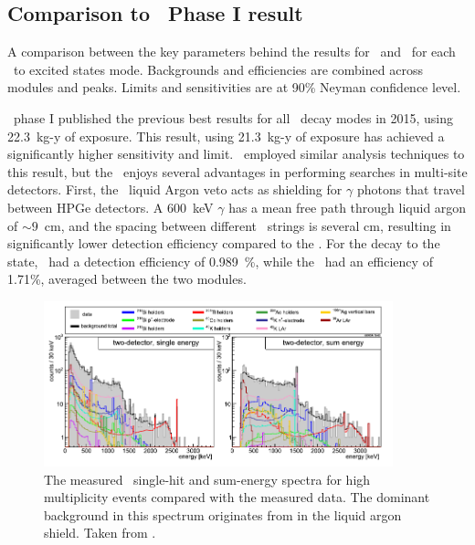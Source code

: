 \documentclass[/main.tex]{subfiles}
\begin{document}
\subsection{Comparison to \Gerda\ Phase I result}
\begin{table}[h]
  \centering
  \caption[Comparison between results from the \MJD\ and \Gerda]{\label{tab:mjdgerdacomp}
    A comparison between the key parameters behind the results for \MJD\ and \Gerda\ for each \tnbb\ to excited states mode. Backgrounds and efficiencies are combined across modules and peaks. Limits and sensitivities are at 90\% Neyman confidence level.
  }
  
  
\end{table}
\Gerda\ phase I published the previous best results for all \tnbb\ decay modes in 2015, using 22.3~kg-y of exposure\cite{gerdaESresult}.
This result, using 21.3~kg-y of exposure has achieved a significantly higher sensitivity and limit.
\Gerda\ employed similar analysis techniques to this result, but the \MJD\ enjoys several advantages in performing searches in multi-site detectors.
First, the \Gerda\ liquid Argon veto acts as shielding for $\gamma$ photons that travel between HPGe detectors.
A 600~keV $\gamma$ has a mean free path through liquid argon of $\sim9$~cm, and the spacing between different \Gerda\ strings is several cm, resulting in significantly lower detection efficiency compared to the \MJD.
For the decay to the  state, \Gerda\ had a detection efficiency of 0.989~\%, while the \MJD\ had an efficiency of 1.71\%, averaged between the two modules.
\\
\begin{figure}[h]
  \centering
  \includegraphics[width=0.9\textwidth]{gerdabackgrounds}
  \caption[\Gerda\ multi-site event backgrounds]{\label{gerdabgmodel}
    The measured \Gerda\ single-hit and sum-energy spectra for high multiplicity events compared with the measured data. The dominant background in this spectrum originates from  in the liquid argon shield. Taken from \cite{gerdaESresult}.
  }
\end{figure}
\end{document}
